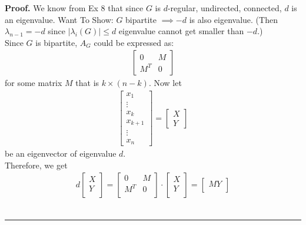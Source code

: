 \documentclass[12pt]{article}
\newenvironment{proof}[1][Proof]{\textbf{#1.} }{\ \rule{0.5em}{0.5em}}
\begin{document}
\begin{proof}
    We know from Ex 8 that since $G$ is $d$-regular, undirected, 
    connected, $d$ is an eigenvalue. Want To Show:
    $G$ bipartite $\implies -d$ is also eigenvalue. 
    (Then $\lambda_{n-1} = -d$ since $\lvert \lambda_i (G) \rvert \leq d$
    eigenvalue cannot get smaller than $-d$.)\\
    Since $G$ is bipartite, $A_G$ could be expressed as:
    \begin{align}
        \begin{bmatrix} 
            0 & M \\
            M^T & 0
        \end{bmatrix}
    \end{align}
    for some matrix $M$ that is $k \times (n-k)$.
    Now let 
    \begin{align}
        \begin{bmatrix}
            x_1\\
            \vdots\\
            x_k\\
            x_{k+1}\\
            \vdots\\
            x_n
        \end{bmatrix}
        =
        \begin{bmatrix}
            X\\
            Y
        \end{bmatrix}
    \end{align}
    be an eigenvector of eigenvalue $d$.\\
    Therefore, we get
    \begin{align}
        d
        \begin{bmatrix}
            X\\
            Y\\
        \end{bmatrix}
        =
        \begin{bmatrix}
            0 & M\\
            M^T & 0\\
        \end{bmatrix}
        \cdot
        \begin{bmatrix}
            X\\
            Y\\
        \end{bmatrix}
        =
        \begin{bmatrix}
            M Y \\

\end{bmatrix}
\end{align}
\end{proof}
\end{document}
